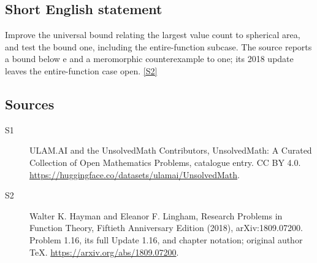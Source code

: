 \documentclass[11pt]{article}
\newcommand{\sref}[2]{\hyperlink{source:#1:#2}{[S#2]}}
\begin{document}
\subsection{Short English statement}
Improve the universal bound relating the largest value count to spherical area, and test the bound one, including the entire-function subcase. The source reports a bound below e and a meromorphic counterexample to one; its 2018 update leaves the entire-function case open. \sref{statement}{2}
\subsection{Sources}
\begin{description}
\item[\hypertarget{source:statement:1}{S1}] ULAM.AI and the UnsolvedMath Contributors, UnsolvedMath: A Curated Collection of Open Mathematics Problems, catalogue entry. CC BY 4.0. \url{https://huggingface.co/datasets/ulamai/UnsolvedMath}.
\item[\hypertarget{source:statement:2}{S2}] Walter K. Hayman and Eleanor F. Lingham, Research Problems in Function Theory, Fiftieth Anniversary Edition (2018), arXiv:1809.07200. Problem 1.16, its full Update 1.16, and chapter notation; original author TeX. \url{https://arxiv.org/abs/1809.07200}.
\end{description}
\label{end:statement}
\end{document}
